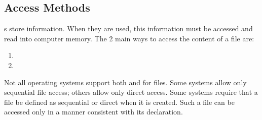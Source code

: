 \subsection{Access Methods}\label{subsec:Access_Methods}
s store information.
When they are used, this information must be accessed and read into computer memory.
The 2 main ways to access the content of a file are:
\begin{enumerate}[noitemsep]
\item {}
\item {}
\end{enumerate}

Not all operating systems support both  and  for files.
Some systems allow only sequential file access; others allow only direct access.
Some systems require that a file be defined as sequential or direct when it is created.
Such a file can be accessed only in a manner consistent with its declaration.


